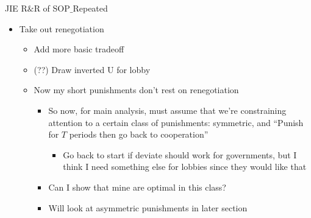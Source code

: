 \documentclass[12pt]{article}
\begin{document}
\begin{center}
JIE R$\&$R of SOP$\_$Repeated
\end{center}



\begin{itemize}
	\item Take out renegotiation
		\begin{itemize}
			\item Add more basic tradeoff
			\item (??) Draw inverted U for lobby
			\item Now my short punishments don't rest on renegotiation
				\begin{itemize}
					\item So now, for main analysis, must assume that we're constraining attention to a certain class of punishments: symmetric, and ``Punish for $T$ periods then go back to cooperation''
						\begin{itemize}
							\item Go back to start if deviate should work for governments, but I think I need something else for lobbies since they would like that
						\end{itemize}
					\item Can I show that mine are optimal in this class?
					\item Will look at asymmetric punishments in later section
				\end{itemize}
		\end{itemize}
	

\end{itemize}
\end{document}
